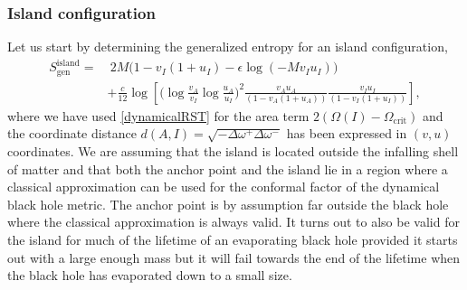 \documentclass[12pt,a4paper]{article}
\newcommand{\f}[2]{\frac{#1}{#2}}
\begin{document}
\subsubsection{Island configuration}
Let us start by determining the generalized entropy for an island configuration,
\begin{align}\label{Sgendyn}
S_\text{gen}^\text{island} = &\ 2M\big(1-v_I(1+u_I)-\epsilon\log{(-Mv_Iu_I)}\big)\\
 & {+}\f{c}{12} \log\left[\Big(\log\f{v_A}{v_I}\log\f{u_A}{u_I}\Big)^2\f{ v_Au_A}{(1-v_A(1+u_A))}\f{v_I u_I}{(1-v_I(1+u_I))} \right] ,\nonumber
\label{Sgendyn}
\end{align}
where we have used \eqref{dynamicalRST} for the area term $2(\Omega(I)-\Omega_\text{crit})$ and the coordinate distance $d(A,I)=\sqrt{-\Delta\omega^+\Delta\omega^-}$ has been expressed in $(v,u)$ coordinates. We are assuming that the island is located outside the infalling shell of matter and that both the anchor point and the island lie in a region where a classical approximation can be used for the conformal factor of the dynamical black hole metric. The anchor point is by assumption far outside the black hole where the classical approximation is always valid. It turns out to also be valid for the island for much of the lifetime of an evaporating black hole provided it starts out with a large enough mass but it will fail towards the end of the lifetime when the black hole has evaporated down to a small size. 
\end{document}
